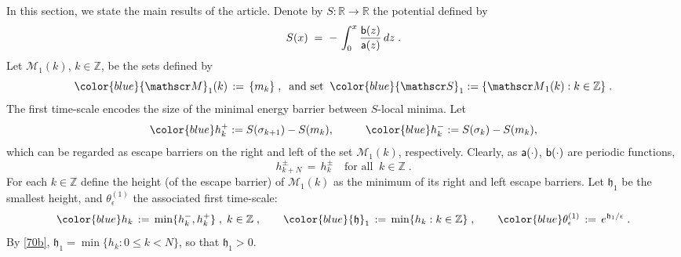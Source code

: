\documentclass[reqno]{amsart}
\theoremstyle{plain}
\theoremstyle{definition}
\newcommand{\mf}[1]{{\mathfrak #1}}
\newcommand{\bb}[1]{{\mathbb #1}}
\newcommand{\ms}[1]{{\mathscr #1}}
\newcommand{\mss}[1]{{\textsf #1}}
\newcounter{as}[section]
\newcommand{\<}{\langle}
\renewcommand{\>}{\rangle}
\begin{document}
In this section, we state the main results of the article.  Denote by
$S\colon \bb R\to \bb R$ the potential defined by
\begin{equation}
\label{34}
S(x) \;=\; -\, \int_0^x \frac{\mss b(z)}{\mss a(z)}   \, dz\;.
\end{equation}
Let $\ms M_{1}(k)$, $k\in \bb Z$, be the sets
defined by
\begin{equation*}
{\color{blue}\ms M_{1}(k)} \,:=\, \{m_{k}\} \;, \;\;
\text{and set}\;\;
{\color{blue}\ms S_{1}}:= \{\ms M_{1}(k) : k\in \bb Z\}\;.
\end{equation*} 
The first time-scale encodes the size of the minimal energy barrier
between $S$-local minima. Let
\begin{equation}
\label{f01}
{\color{blue} h^{+}_{k}}  := S(\sigma_{k+1}) - S(m_{k}),
\hspace{10mm}
{\color{blue}  h^{-}_{k}} := S(\sigma_{k}) - S(m_{k}),
\end{equation}
which can be regarded as escape barriers on the right and left of the
set $\ms M_{1}(k)$, respectively. Clearly, as $\mss a(\cdot)$, $\mss
b(\cdot)$ are periodic functions,
\begin{equation}
\label{70b}
h^\pm_{k+N} \,=\, h^\pm _k\quad\text{for all}\;\;
k\in \bb Z\;. 
\end{equation}
For each $k\in \bb Z$ define the height (of the escape barrier) of
$\ms M_{1}(k)$ as the minimum of its right and left escape
barriers. Let $\mf h_1$ be the smallest height, and
$\theta_{\epsilon}^{(1)}$ the associated first time-scale:
\begin{equation}
\label{69b}
{\color{blue}   h_k}  \,:=\, \min\{h^{-}_{k}, h^{+}_{k}\}
\;, \; k\in \bb Z\;, \qquad
{\color{blue}\mf h_1}  \,:=\, \min\{h_k : k\in \bb Z\}\;,
\qquad
{\color{blue}\theta_{\epsilon}^{(1)}} \,:=\,
e^{\mf h_1/\epsilon}\;.
\end{equation}
By \eqref{70b}, $\mf h_1 = \min\{h_k : 0 \le k<N \}$, so that
$\mf h_1>0$.
\end{document}
